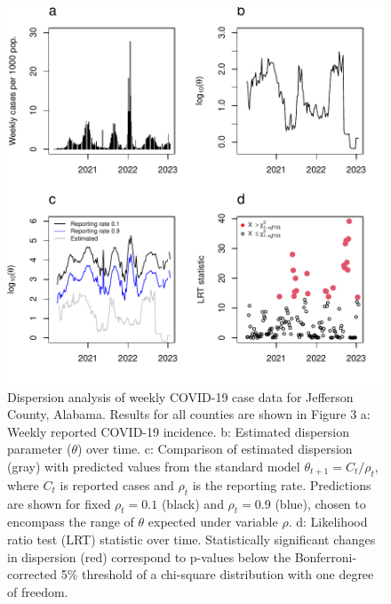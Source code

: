 \documentclass[11pt,letterpaper]{article}
\begin{document}
\clearpage
\begin{figure}[!ht]
\includegraphics[width=1\textwidth]{fig2}
\caption{Dispersion analysis of weekly COVID-19 case data for Jefferson County, Alabama. 
Results for all counties are shown in Figure 3  %
a: Weekly reported COVID-19 incidence.  
b: Estimated dispersion parameter ($\theta$) over time.  
c: Comparison of estimated dispersion (gray) with predicted values from the standard model $\theta_{t+1} = C_t / \rho_t$, where $C_t$ is reported cases and $\rho_t$ is the reporting rate. Predictions are shown for fixed $\rho_t = 0.1$ (black) and $\rho_t = 0.9$ (blue), chosen to encompass the range of $\theta$ expected under variable $\rho$.  
d: Likelihood ratio test (LRT) statistic over time. Statistically significant changes in dispersion (red) correspond to p-values below the Bonferroni-corrected 5\% threshold of a chi-square distribution with one degree of freedom.  
}\label{fig2}
\end{figure}
\clearpage
\end{document}
